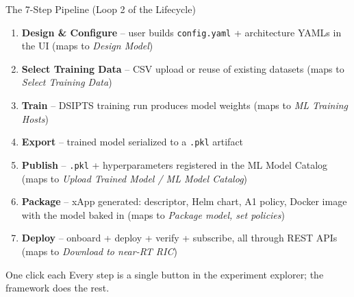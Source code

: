 \documentclass[aspectratio=169]{beamer}
\begin{document}
\begin{frame}{The 7-Step Pipeline (Loop 2 of the Lifecycle)}
  \small
  \begin{enumerate}
    \item \textbf{Design \& Configure} -- user builds \texttt{config.yaml} + architecture YAMLs in the UI (maps to \emph{Design Model})
    \item \textbf{Select Training Data} -- CSV upload or reuse of existing datasets (maps to \emph{Select Training Data})
    \item \textbf{Train} -- DSIPTS training run produces model weights (maps to \emph{ML Training Hosts})
    \item \textbf{Export} -- trained model serialized to a \texttt{.pkl} artifact
    \item \textbf{Publish} -- \texttt{.pkl} + hyperparameters registered in the ML Model Catalog (maps to \emph{Upload Trained Model / ML Model Catalog})
    \item \textbf{Package} -- xApp generated: descriptor, Helm chart, A1 policy, Docker image with the model baked in (maps to \emph{Package model, set policies})
    \item \textbf{Deploy} -- onboard + deploy + verify + subscribe, all through REST APIs (maps to \emph{Download to near-RT RIC})
  \end{enumerate}
  \begin{alertblock}{One click each}
    Every step is a single button in the experiment explorer; the framework does the rest.
  \end{alertblock}
\end{frame}
\end{document}
